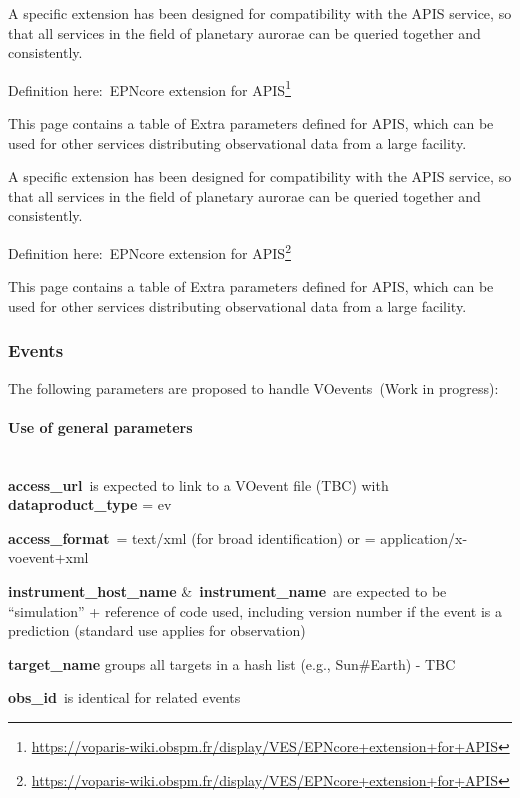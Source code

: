 \documentclass[11pt,a4paper]{ivoa}
\begin{document}
A specific extension has been designed for compatibility with the APIS service, so that all services in the field of planetary aurorae can be queried together and consistently.

Definition here: EPNcore extension for APIS\footnote{\url{https://voparis-wiki.obspm.fr/display/VES/EPNcore+extension+for+APIS}}

This page contains a table of Extra parameters defined for APIS, which can be used for other services distributing observational data from a large facility.

A specific extension has been designed for compatibility with the APIS service, so that all services in the field of planetary aurorae can be queried together and consistently.

Definition here: EPNcore extension for APIS\footnote{\url{https://voparis-wiki.obspm.fr/display/VES/EPNcore+extension+for+APIS}}

This page contains a table of Extra parameters defined for APIS, which can be used for other services distributing observational data from a large facility.

\subsubsection{Events\\}

The following parameters are proposed to handle VOevents (Work in progress):

\paragraph{Use of general parameters\textbf{ }}

\\

\textbf{access\_url} is expected to link to a VOevent file (TBC) with \textbf{dataproduct\_type} = ev 

\textbf{access\_format} = text/xml (for broad identification) or = application/x-voevent+xml 

\textbf{instrument\_host\_name }\& \textbf{instrument\_name} are expected to be ``simulation'' + reference of code used, including version number if the event is a prediction (standard use applies for observation)

\textbf{target\_name} groups all targets in a hash list (e.g., Sun\#Earth) - TBC

\textbf{obs\_id} is identical for related events
\end{document}
